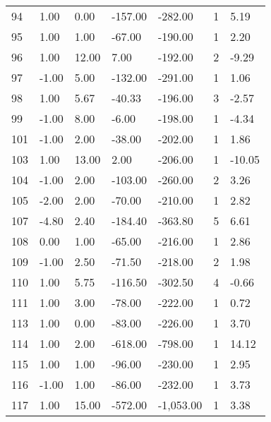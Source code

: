 \begin{appendices}
\begin{longtable}[c]{@{}lllllll@{}}
94 & 1.00 & 0.00 & -157.00 & -282.00 & 1 & 5.19 \\

95 & 1.00 & 1.00 & -67.00 & -190.00 & 1 & 2.20 \\

96 & 1.00 & 12.00 & 7.00 & -192.00 & 2 & -9.29 \\

97 & -1.00 & 5.00 & -132.00 & -291.00 & 1 & 1.06 \\

98 & 1.00 & 5.67 & -40.33 & -196.00 & 3 & -2.57 \\

99 & -1.00 & 8.00 & -6.00 & -198.00 & 1 & -4.34 \\

101 & -1.00 & 2.00 & -38.00 & -202.00 & 1 & 1.86 \\

103 & 1.00 & 13.00 & 2.00 & -206.00 & 1 & -10.05 \\

104 & -1.00 & 2.00 & -103.00 & -260.00 & 2 & 3.26 \\

105 & -2.00 & 2.00 & -70.00 & -210.00 & 1 & 2.82 \\

107 & -4.80 & 2.40 & -184.40 & -363.80 & 5 & 6.61 \\

108 & 0.00 & 1.00 & -65.00 & -216.00 & 1 & 2.86 \\

109 & -1.00 & 2.50 & -71.50 & -218.00 & 2 & 1.98 \\

110 & 1.00 & 5.75 & -116.50 & -302.50 & 4 & -0.66 \\

111 & 1.00 & 3.00 & -78.00 & -222.00 & 1 & 0.72 \\

113 & 1.00 & 0.00 & -83.00 & -226.00 & 1 & 3.70 \\

114 & 1.00 & 2.00 & -618.00 & -798.00 & 1 & 14.12 \\

115 & 1.00 & 1.00 & -96.00 & -230.00 & 1 & 2.95 \\

116 & -1.00 & 1.00 & -86.00 & -232.00 & 1 & 3.73 \\

117 & 1.00 & 15.00 & -572.00 & -1,053.00 & 1 & 3.38 \\


\end{longtable}
\end{appendices}
